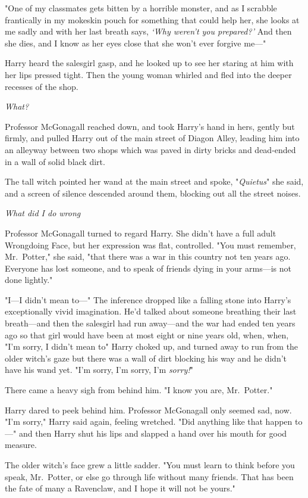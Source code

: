 "One of my classmates gets bitten by a horrible monster, and as I scrabble
frantically in my mokeskin pouch for something that could help her, she looks
at me sadly and with her last breath says, \emph{`Why weren't you prepared?'}
And then she dies, and I know as her eyes close that she won't ever forgive
me—"

Harry heard the salesgirl gasp, and he looked up to see her staring at him with
her lips pressed tight. Then the young woman whirled and fled into the deeper
recesses of the shop.

\emph{What{\el}?}

Professor McGonagall reached down, and took Harry's hand in hers, gently but
firmly, and pulled Harry out of the main street of Diagon Alley, leading him
into an alleyway between two shops which was paved in dirty bricks and
dead-ended in a wall of solid black dirt.

The tall witch pointed her wand at the main street and spoke, "\emph{Quietus}"
she said, and a screen of silence descended around them, blocking out all the
street noises.

\emph{What did I do wrong{\el}}

Professor McGonagall turned to regard Harry. She didn't have a full adult
Wrongdoing Face, but her expression was flat, controlled. "You must remember,
Mr.~Potter," she said, "that there was a war in this country not ten years ago.
Everyone has lost someone, and to speak of friends dying in your arms—is not
done lightly."

"I—I didn't mean to—" The inference dropped like a falling stone into
Harry's exceptionally vivid imagination. He'd talked about someone breathing
their last breath—and then the salesgirl had run away—and the war had ended
ten years ago so that girl would have been at most eight or nine years old,
when, when, "I'm sorry, I didn't mean to{\el}" Harry choked up, and turned
away to run from the older witch's gaze but there was a wall of dirt blocking
his way and he didn't have his wand yet. "I'm sorry, I'm sorry, I'm
\emph{sorry!}"

There came a heavy sigh from behind him. "I know you are, Mr.~Potter."

Harry dared to peek behind him. Professor McGonagall only seemed sad, now. "I'm
sorry," Harry said again, feeling wretched. "Did anything like that happen
to—" and then Harry shut his lips and slapped a hand over his mouth for good
measure.

The older witch's face grew a little sadder. "You must learn to think before
you speak, Mr.~Potter, or else go through life without many friends. That has
been the fate of many a Ravenclaw, and I hope it will not be yours."


